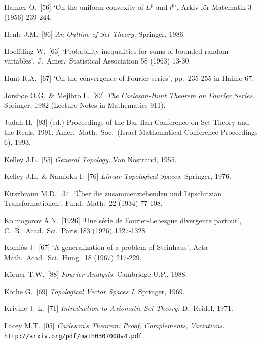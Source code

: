 {Hanner O.\ [56] `On the uniform convexity of $L^p$ and $l^p$',
Arkiv f\"or Matematik 3 (1956) 239-244.
\cmmnt{[244O.]}

Henle J.M.\ [86] {\it An Outline of Set Theory.}  Springer, 1986.
\cmmnt{[\S2A1.]}

Hoeffding W.\ [63]
`Probability inequalities for sums of bounded random variables',
J.\ Amer.\ Statistical Association 58 (1963) 13-30.
\cmmnt{[272W.]}

Hunt R.A.\ [67] `On the convergence of Fourier series', pp.\ 235-255
in {\smc Haimo 67}.  \cmmnt{[\S286 {\it catatan}.]}

\medskip%

Jorsb{\o}e O.G.\ \& Mejlbro L.\ [82] {\it The Carleson-Hunt Theorem on
Fourier Series.}  Springer, 1982 (Lecture Notes in Mathematics 911).
\cmmnt{[\S286 {\it catatan}.]}

Judah H.\ [93] (ed.) {Proceedings of the Bar-Ilan Conference on Set
Theory and the Reals, 1991.} Amer.\ Math.\ Soc.\ (Israel Mathematical
Conference Proceedings 6), 1993.

\medskip%

Kelley J.L.\ [55] {\it General Topology.} Van Nostrand, 1955.
\cmmnt{[2A5F.]}

Kelley J.L.\ \& Namioka I.\ [76] {\it Linear Topological Spaces.}
Springer, 1976.   \cmmnt{[2A5C.]}

Kirszbraun M.D.\ [34] `\"Uber die zusammenziehenden und Lipschitzian
Transformationen', Fund.\ Math.\ 22 (1934) 77-108.  \cmmnt{[262C.]}

Kolmogorov A.N.\ [1926] `Une s\'erie de Fourier-Lebesgue divergente
partout', C.\ R.\ Acad.\ Sci.\ Paris 183 (1926) 1327-1328.
\cmmnt{[\S282 {\it catatan}.]}

Koml\'os J.\ [67] `A generalization of a problem of Steinhaus', Acta
Math.\ Acad.\ Sci.\ Hung.\ 18 (1967) 217-229.  \cmmnt{[276H.]}

K\"orner T.W.\ [88] {\it Fourier Analysis.}  Cambridge U.P., 1988.
\cmmnt{[\S282 {\it catatan}.]}

K\"othe G.\ [69] {\it Topological Vector Spaces I.}   Springer, 1969.
\cmmnt{[2A5C, 2A5E, 2A5J.]}

Krivine J.-L.\ [71] {\it Introduction to Axiomatic Set Theory.}
D.~Reidel, 1971.  \cmmnt{[\S2A1.]}

\medskip%

Lacey M.T.\ [05] {\it Carleson's Theorem: Proof, Complements, Variations.}
{\tt http://arxiv.org/pdf/math{\bsp}0307008v4{}.pdf}.
\cmmnt{[\S286 {\it catatan}.]}

}
